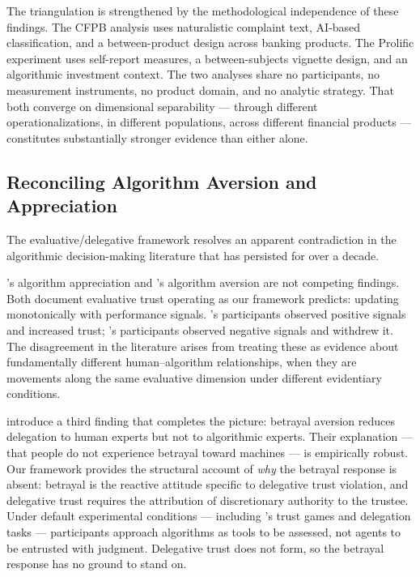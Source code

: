 The triangulation is strengthened by the methodological independence of these findings. The CFPB analysis uses naturalistic complaint text, AI-based classification, and a between-product design across banking products. The Prolific experiment uses self-report measures, a between-subjects vignette design, and an algorithmic investment context. The two analyses share no participants, no measurement instruments, no product domain, and no analytic strategy. That both converge on dimensional separability --- through different operationalizations, in different populations, across different financial products --- constitutes substantially stronger evidence than either alone.

\subsection{Reconciling Algorithm Aversion and Appreciation}
\label{sec:disc_reconciling}

The evaluative/\hspace{0pt}delegative framework resolves an apparent contradiction in the algorithmic decision-mak\-ing literature that has persisted for over a decade.

\citeauthor{LoggMinsonMoore2019}'s \citeyearpar{LoggMinsonMoore2019} algorithm appreciation and \citeauthor{DietvorstSimmonsMassey2015}'s \citeyearpar{DietvorstSimmonsMassey2015} algorithm aversion are not competing findings. Both document evaluative trust operating as our framework predicts: updating monotonically with performance signals. \citeauthor{LoggMinsonMoore2019}'s participants observed positive signals and increased trust; \citeauthor{DietvorstSimmonsMassey2015}'s participants observed negative signals and withdrew it. The disagreement in the literature arises from treating these as evidence about fundamentally different human--algorithm relationships, when they are movements along the same evaluative dimension under different evidentiary conditions.

\citet{kormylo2026} introduce a third finding that completes the picture: betrayal aversion reduces delegation to human experts but not to algorithmic experts. Their explanation --- that people do not experience betrayal toward machines --- is empirically robust. Our framework provides the structural account of \emph{why} the betrayal response is absent: betrayal is the reactive attitude specific to delegative trust violation, and delegative trust requires the attribution of discretionary authority to the trustee. Under default experimental conditions --- including \citeauthor{kormylo2026}'s trust games and delegation tasks --- participants approach algorithms as tools to be assessed, not agents to be entrusted with judgment. Delegative trust does not form, so the betrayal response has no ground to stand on.

